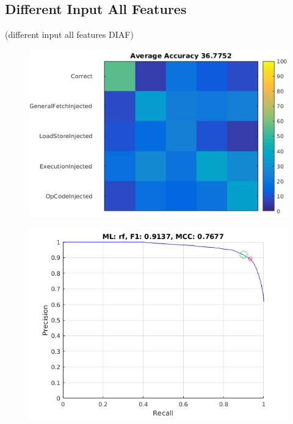 \subsection{Different Input All Features}
(different input all features DIAF)

\begin{figure}[t]
\begin{center}
   \includegraphics[width=0.95\linewidth]{./figures/diaf_multi.png}
\end{center}
   \caption{}
\label{fig:diaf-multi}
\end{figure}

\begin{figure}[t]
\begin{center}
   \includegraphics[width=0.95\linewidth]{./figures/disf.png}
\end{center}
   \caption{}
\label{fig:disf}
\end{figure}

